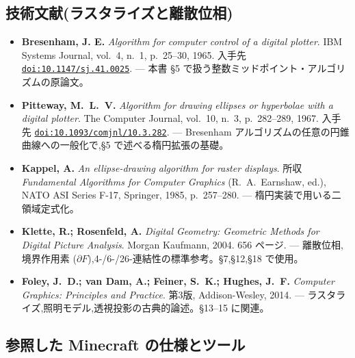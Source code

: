 \documentclass[12pt,a4paper]{scrartcl}
\newcommand{\biblink}[2]{\href{#1}{\nolinkurl{#2}}}
\begin{document}
\subsection*{技術文献(ラスタライズと離散位相)}

\begin{itemize}[leftmargin=1.4em,itemsep=0.3em,topsep=0.3em]
  \item \textbf{Bresenham, J. E.} \emph{Algorithm for computer control of a digital plotter}.
        IBM Systems Journal, vol.~4, n.~1, p.~25--30, 1965.
        入手先 \biblink{https://doi.org/10.1147/sj.41.0025}{doi:10.1147/sj.41.0025}.
        --- 本書 §5 で扱う整数ミッドポイント・アルゴリズムの原論文。

  \item \textbf{Pitteway, M.~L.~V.} \emph{Algorithm for drawing ellipses or hyperbolae
        with a digital plotter}. The Computer Journal, vol.~10, n.~3, p.~282--289, 1967.
        入手先 \biblink{https://doi.org/10.1093/comjnl/10.3.282}{doi:10.1093/comjnl/10.3.282}.
        --- Bresenham アルゴリズムの任意の円錐曲線への一般化で,§5 で述べる楕円拡張の基礎。

  \item \textbf{Kappel, A.} \emph{An ellipse-drawing algorithm for raster displays}.
        所収 \emph{Fundamental Algorithms for Computer Graphics} (R.~A.~Earnshaw, ed.),
        NATO ASI Series F-17, Springer, 1985, p.~257--280.
        --- 楕円実装で用いる二領域定式化。

  \item \textbf{Klette, R.; Rosenfeld, A.} \emph{Digital Geometry: Geometric Methods
        for Digital Picture Analysis}. Morgan Kaufmann, 2004. 656 ページ.
        --- 離散位相,境界作用素 ($\partial F$),4-/6-/26-連結性の標準参考。§7,§12,§18 で使用。

  \item \textbf{Foley, J.~D.; van Dam, A.; Feiner, S.~K.; Hughes, J.~F.}
        \emph{Computer Graphics: Principles and Practice}. 第3版, Addison-Wesley, 2014.
        --- ラスタライズ,照明モデル,透視投影の古典的論述。§13--15 に関連。
\end{itemize}

\subsection*{参照した Minecraft の仕様とツール}
\end{document}

